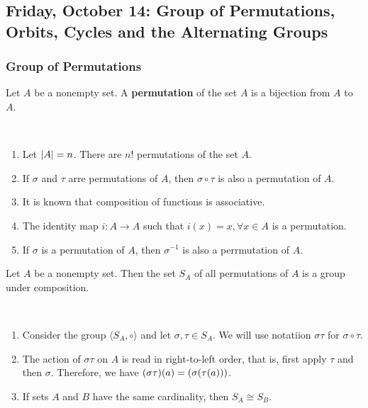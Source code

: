 \subsection{Friday, October 14: Group of Permutations, Orbits, Cycles and the Alternating Groups}

\subsubsection{Group of Permutations}

\begin{definition}
    Let $A$ be a nonempty set. A \textbf{permutation} of the set $A$ is a bijection from $A$ to $A$.
\end{definition}

\begin{remark} \phantom{blank} \\
    \begin{enumerate}
        \item Let $\qty|A| = n$. There are $n!$ permutations of the set $A$.
        \item If $\sigma$ and $\tau$ arre permutations of $A$, then $\sigma \circ \tau$ is also a permutation of $A$.
        \item It is known that composition of functions is associative.
        \item The identity map $i : A \to A$ such that $i(x) = x, \forall x \in A$ is a permutation.
        \item  If $\sigma$ is a permutation of $A$, then $\sigma^{-1}$ is also a perrmutation of $A$.
    \end{enumerate}
\end{remark}

\begin{theorem}
    Let $A$ be a nonempty set. Then the set $S_A$ of all permutations of $A$ is a group under composition.
\end{theorem}

\begin{remark} \phantom{blank} \\
    \begin{enumerate}
        \item Consider the group $\langle S_A, \circ  \rangle$ and let $\sigma, \tau \in S_A$. We will use notatiion $\sigma \tau$ for $\sigma \circ \tau$.
        \item The action of $\sigma \tau$ on $A$ is read in right-to-left order, that is, first apply $\tau$ and then $\sigma$. Therefore, we have $\qty(\sigma  \tau) \qty(a) = \qty(\sigma \qty(\tau \qty(a)))$.
        \item If sets $A$ and $B$ have the same cardinality, then $S_A \cong S_B$.
    \end{enumerate}
\end{remark}


